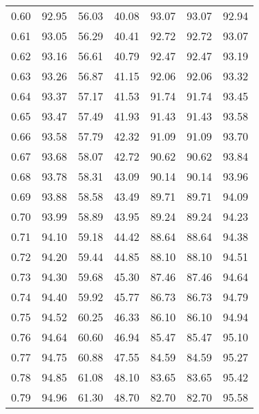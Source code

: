 \begin{tabular}{|c|c|c|c|c|c|c|}
      0.60 &     92.95 &     56.03 &      40.08 &   93.07 &      93.07 &         92.94 \\
      0.61 &     93.05 &     56.29 &      40.41 &   92.72 &      92.72 &         93.07 \\
      0.62 &     93.16 &     56.61 &      40.79 &   92.47 &      92.47 &         93.19 \\
      0.63 &     93.26 &     56.87 &      41.15 &   92.06 &      92.06 &         93.32 \\
      0.64 &     93.37 &     57.17 &      41.53 &   91.74 &      91.74 &         93.45 \\
      0.65 &     93.47 &     57.49 &      41.93 &   91.43 &      91.43 &         93.58 \\
      0.66 &     93.58 &     57.79 &      42.32 &   91.09 &      91.09 &         93.70 \\
      0.67 &     93.68 &     58.07 &      42.72 &   90.62 &      90.62 &         93.84 \\
      0.68 &     93.78 &     58.31 &      43.09 &   90.14 &      90.14 &         93.96 \\
      0.69 &     93.88 &     58.58 &      43.49 &   89.71 &      89.71 &         94.09 \\
      0.70 &     93.99 &     58.89 &      43.95 &   89.24 &      89.24 &         94.23 \\
      0.71 &     94.10 &     59.18 &      44.42 &   88.64 &      88.64 &         94.38 \\
      0.72 &     94.20 &     59.44 &      44.85 &   88.10 &      88.10 &         94.51 \\
      0.73 &     94.30 &     59.68 &      45.30 &   87.46 &      87.46 &         94.64 \\
      0.74 &     94.40 &     59.92 &      45.77 &   86.73 &      86.73 &         94.79 \\
      0.75 &     94.52 &     60.25 &      46.33 &   86.10 &      86.10 &         94.94 \\
      0.76 &     94.64 &     60.60 &      46.94 &   85.47 &      85.47 &         95.10 \\
      0.77 &     94.75 &     60.88 &      47.55 &   84.59 &      84.59 &         95.27 \\
      0.78 &     94.85 &     61.08 &      48.10 &   83.65 &      83.65 &         95.42 \\
      0.79 &     94.96 &     61.30 &      48.70 &   82.70 &      82.70 &         95.58 \\

\end{tabular}
